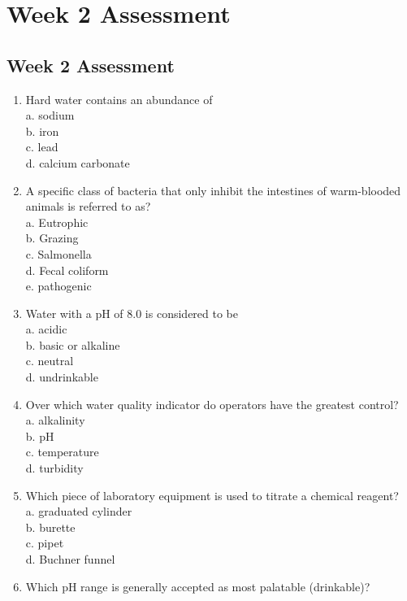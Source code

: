 
\chapter{Week 2 Assessment}
\section{Week 2 Assessment}
\begin{enumerate}[1.]

\item Hard water contains an abundance of\\
a. sodium\\
b. iron\\
c. lead\\
d. calcium carbonate\\
\item A specific class of bacteria that only inhibit the intestines of warm-blooded animals is referred to as?\\
a. Eutrophic\\
b. Grazing\\
c. Salmonella\\
d. Fecal coliform\\
e. pathogenic\\
\item Water with a $\mathrm{pH}$ of 8.0 is considered to be\\
a. acidic\\
b. basic or alkaline\\
c. neutral\\
d. undrinkable\\
\item Over which water quality indicator do operators have the greatest control?\\
a. alkalinity\\
b. $\mathrm{pH}$\\
c. temperature\\
d. turbidity\\
\item Which piece of laboratory equipment is used to titrate a chemical reagent?\\
a. graduated cylinder\\
b. burette\\
c. pipet\\
d. Buchner funnel\\
\item Which $\mathrm{pH}$ range is generally accepted as most palatable (drinkable)?\\

\end{enumerate}
